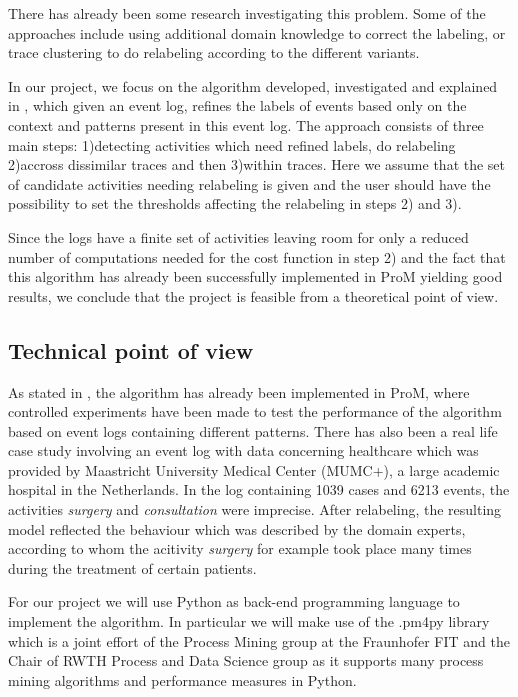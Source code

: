\documentclass[notitlepage]{article}
\begin{document}
\begin{flushleft}
There has already been some research investigating this problem. 
Some of the approaches include using additional domain knowledge to correct the labeling, or trace clustering to do relabeling according to the different variants.

In our project, we focus on the algorithm developed, investigated and explained in \cite{paper}, which given an event log, refines the labels of events based only on the context and patterns present in this event log.
The approach consists of three main steps: 1)detecting activities which need refined labels, do relabeling 2)accross dissimilar traces and then 3)within traces.
Here we assume that the set of candidate activities needing relabeling is given and the user should have the possibility to set the thresholds affecting the relabeling in steps 2) and 3).

Since the logs have a finite set of activities leaving room for only a reduced number of computations needed for the cost function in step 2) and the fact that this algorithm has already been successfully implemented in ProM yielding good results, we conclude that the project is feasible from a theoretical point of view.\\

\subsection{Technical point of view}

As stated in \cite{paper}, the algorithm has already been implemented in ProM, where controlled experiments have been made to test the performance of the algorithm based on event logs containing different patterns.
There has also been a real life case study involving an event log with data concerning healthcare which was provided by Maastricht University Medical Center (MUMC+), a large academic hospital in the Netherlands.
In the log containing 1039 cases and 6213 events, the activities \textit{surgery} and \textit{consultation} were imprecise.
After relabeling, the resulting model reflected the behaviour which was described by the domain experts, according to whom the acitivity \textit{surgery} for example took place many times during the treatment of certain patients.

For our project we will use Python as back-end programming language to implement the algorithm. 
In particular we will make use of the .pm4py library which is a joint effort of the Process Mining group at the Fraunhofer FIT and the Chair of
RWTH Process and Data Science group as it supports many process mining
algorithms and performance measures in Python.


\end{flushleft}
\end{document}
